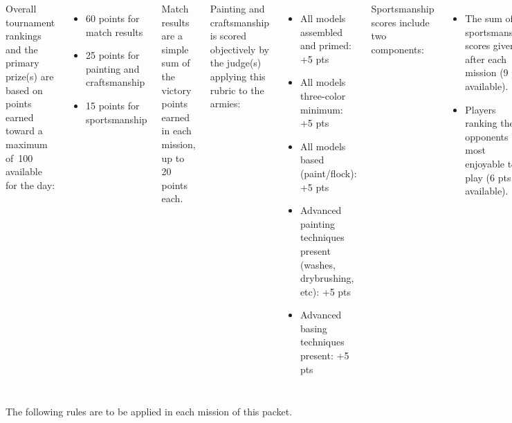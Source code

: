\documentclass{40k}
\begin{document}
\begin{columns}
Overall tournament rankings and the primary prize(s) are based on
points earned toward a maximum of~100 available for the day:
\begin{itemize}\shortlist
\item 60 points for match results
\item 25 points for painting and craftsmanship
\item 15 points for sportsmanship
\end{itemize}

Match results are a simple sum of the victory points earned in each
mission, up to 20 points each.

Painting and craftsmanship is scored objectively by the judge(s)
applying this rubric to the armies:

\begin{itemize}\shortlist
\item All models assembled and primed: +5 pts
\item All models three-color minimum: +5 pts
\item All models based (paint/flock): +5 pts
\item Advanced painting techniques present (washes, drybrushing, etc): +5 pts
\item Advanced basing techniques present: +5 pts
\end{itemize}

Sportsmanship scores include two components:
\begin{itemize}\shortlist
\item The sum of sportsmanship scores given after each mission (9 pts
  available).

\item Players ranking their opponents by most enjoyable to play (6 pts
  available).
\end{itemize}

Please make sure to submit sportsmanship scores as appropriate,
including the final ranking, as otherwise it impairs your opponents'
overall scores!

\end{columns}


\clearpage
{}

The following rules are to be applied in each mission of this packet.
\end{document}
